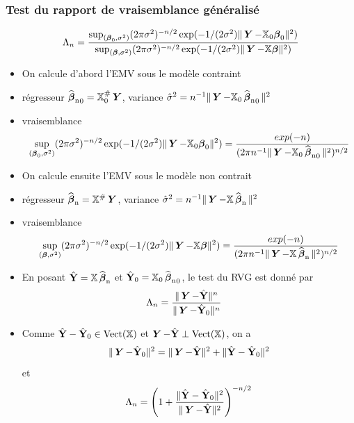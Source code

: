 \begin{frame}
\frametitle{Test du rapport de vraisemblance généralisé}
\[
\Lambda_n = \frac{\sup_{(\truebeta_0,\sigma^2)} (2 \pi \sigma^2)^{-n/2} \exp(-1/(2\sigma^2) \| \bY - \regressmat_0 \truebeta_0\|^2)}{\sup_{(\truebeta,\sigma^2)} (2 \pi \sigma^2)^{-n/2} \exp(-1/(2\sigma^2) \| \bY - \regressmat \truebeta\|^2)}
\]
{
\begin{itemize}
\item On calcule d'abord l'EMV sous le modèle contraint
\item \alert{régresseur} $\estregress_0= \regressmat_0^{\#} \bY$, \alert{variance} $\hat{\sigma}^2= n^{-1} \| \bY - \regressmat_0 \estregress_0\|^2$
\item \alert{vraisemblance}
\[
\sup_{(\truebeta_0,\sigma^2)} (2 \pi \sigma^2)^{-n/2} \exp(-1/(2\sigma^2) \| \bY - \regressmat_0 \truebeta_0\|^2)
= \frac{exp(-n)}{(2 \pi n^{-1} \| \bY - \regressmat_0 \estregress_0\|^2)^{n/2}}
\]
\end{itemize}
}
{
\begin{itemize}
\item On calcule ensuite l'EMV sous le modèle non contrait
\item \alert{régresseur} $\estregress= \regressmat^{\#} \bY$, \alert{variance} $\hat{\sigma}^2= n^{-1} \| \bY - \regressmat \estregress\|^2$
\item \alert{vraisemblance}
\[
\sup_{(\truebeta,\sigma^2)} (2 \pi \sigma^2)^{-n/2} \exp(-1/(2\sigma^2) \| \bY - \regressmat \truebeta\|^2)
= \frac{exp(-n)}{(2 \pi n^{-1} \| \bY - \regressmat \estregress \|^2)^{n/2}}
\]
\end{itemize}
}
{
\begin{itemize}
\item En posant $\predY= \regressmat \estregress$ et $\predY_0= \regressmat_0 \estregress_0$, le test du RVG est donné par
\begin{align*}
\Lambda_n &= \frac{\| \bY - \predY \|^n}{\| \bY - \predY_0 \|^n}
\end{align*}
\item Comme $\predY - \predY_0 \in \vect(\regressmat)$ et $\bY - \predY \perp \vect(\regressmat)$, on a
\[
\| \bY - \predY_0 \|^2 = \|\bY - \predY \|^2 + \| \predY - \predY_0 \|^2
\]
et
\[
\Lambda_n = \left( 1 + \frac{\|\predY - \predY_0\|^2}{\| \bY - \predY\|^2} \right)^{-n/2}
\]
\end{itemize}
}
\end{frame}

